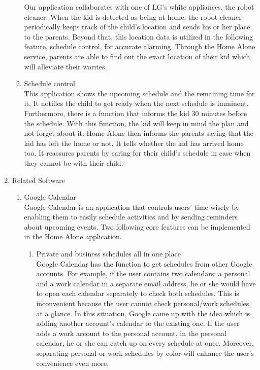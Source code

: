 \documentclass[conference]{IEEEtran}
\begin{document}
\begin{enumerate}[label=\arabic*.]
\begin{enumerate}[label=\alph*.]
        Our application collaborates with one of LG’s white appliances, the robot cleaner. When the kid is detected as being at home, the robot cleaner periodically keeps track of the child’s location and sends his or her place to the parents. Beyond that, this location data is utilized in the following feature, schedule control, for accurate alarming. Through the Home Alone service, parents are able to find out the exact location of their kid which will alleviate their worries. \\
        \item Schedule control  \\
        This application shows the upcoming schedule and the remaining time for it. It notifies the child to get ready when the next schedule is imminent. Furthermore, there is a function that informs the kid 30 minutes before the schedule. With this function, the kid will keep in mind the plan and not forget about it. Home Alone then informs the parents saying that the kid has left the home or not. It tells whether the kid has arrived home too. It reassures parents by caring for their child’s schedule in case when they cannot be with their child. \\
    \end{enumerate}
    \item {\large{Related Software }} \\
    \begin{enumerate}[label=\alph*.]
        \item Google Calendar \\
         Google Calendar is an application that controls users’ time wisely by enabling them to easily schedule activities and by sending reminders about upcoming events. Two following core features can be implemented in the Home Alone application. \\
         \begin{enumerate}[label=\roman*.]
            \item Private and business schedules all in one place \\
            Google Calendar has the function to get schedules from other Google accounts. For example, if the user contains two calendars; a personal and a work calendar in a separate email address, he or she would have to open each calendar separately to check both schedules. This is inconvenient because the user cannot check personal/work schedules at a glance. In this situation, Google came up with the idea which is adding another account’s calendar to the existing one. If the user adds a work account to the personal account, in the personal calendar, he or she can catch up on every schedule at once. Moreover, separating personal or work schedules by color will enhance the user's convenience even more. \\

\end{enumerate}
\end{enumerate}
\end{enumerate}
\end{document}

